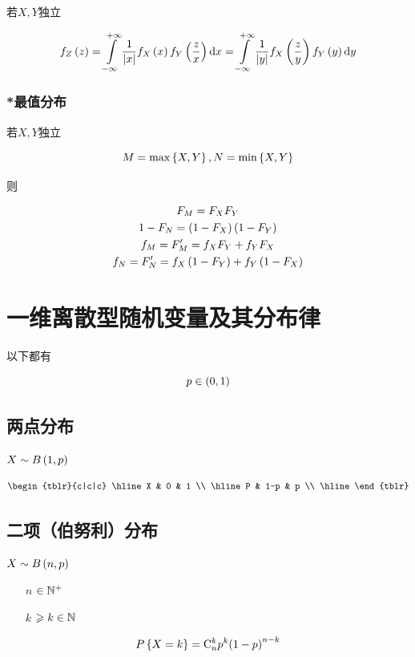 \documentclass{article}
\begin{document}
若$X,Y$独立

\[f_Z\left(z\right)
    =\int\limits_{-\infty}^{+\infty}\frac1{\left|x\right|}f_X\left(x\right)f_Y\left(\frac zx\right)\mathrm d x
    =\int\limits_{-\infty}^{+\infty}\frac1{\left|y\right|}f_X\left(\frac zy\right)f_Y\left(y\right)\mathrm d y\]

\subsubsection{*最值分布}

若$X,Y$独立

\[M=\max\left\{X,Y\right\},N=\min\left\{X,Y\right\}\]

则

\[\begin{gathered}
        F_M=F_XF_Y\\
        1-F_N=\left(1-F_X\right)\left(1-F_Y\right)\\
        f_M=F^\prime_M=f_XF_Y+f_YF_X\\
        f_N=F^\prime_N=f_X\left(1-F_Y\right)+f_Y\left(1-F_X\right)
    \end{gathered}\]


\section{一维离散型随机变量及其分布律}

以下都有

\[p\in\left(0,1\right)\]

\subsection{两点分布}

$X\sim B\left(1,p\right)$

\[\begin{tblr}{c|c|c}
        \hline
        X & 0   & 1 \\
        \hline
        P & 1-p & p \\
        \hline
    \end{tblr}\]

\subsection{二项（伯努利）分布}

$X\sim B\left(n,p\right)$

\begin{enumerate}
    \item [$n$] $\in\mathbb N^+$
    \item [$k$] $\geqslant k\in\mathbb N$
\end{enumerate}

\[P\left\{X=k\right\}=\mathrm C_n^kp^k{\left(1-p\right)}^{n-k}\]
\end{document}
